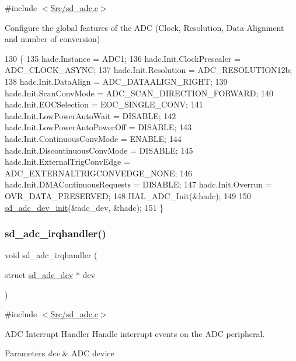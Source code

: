 {\ttfamily \#include $<$\mbox{\hyperlink{sd__adc_8c}{Src/sd\+\_\+adc.\+c}}$>$}

Configure the global features of the A\+DC (Clock, Resolution, Data Alignment and number of conversion)
\begin{DoxyCode}
130 \{
135     hadc.Instance = ADC1;
136     hadc.Init.ClockPrescaler = ADC\_CLOCK\_ASYNC;
137     hadc.Init.Resolution = ADC\_RESOLUTION12b;
138     hadc.Init.DataAlign = ADC\_DATAALIGN\_RIGHT;
139     hadc.Init.ScanConvMode = ADC\_SCAN\_DIRECTION\_FORWARD;
140     hadc.Init.EOCSelection = EOC\_SINGLE\_CONV;
141     hadc.Init.LowPowerAutoWait = DISABLE;
142     hadc.Init.LowPowerAutoPowerOff = DISABLE;
143     hadc.Init.ContinuousConvMode = ENABLE;
144     hadc.Init.DiscontinuousConvMode = DISABLE;
145     hadc.Init.ExternalTrigConvEdge = ADC\_EXTERNALTRIGCONVEDGE\_NONE;
146     hadc.Init.DMAContinuousRequests = DISABLE;
147     hadc.Init.Overrun = OVR\_DATA\_PRESERVED;
148     HAL\_ADC\_Init(&hadc);
149     
150     \mbox{\hyperlink{group___s_d___a_d_c___functions_ga1189f478e64b9aeb4d4ebd4c73e0394e}{sd\_adc\_dev\_init}}(&adc\_dev, &hadc);
151 \}
\end{DoxyCode}
\mbox{\label{group___s_d___a_d_c___functions_ga54804db19c825e0ec5e991ffa4f34123}} 
\subsubsection{\texorpdfstring{sd\+\_\+adc\+\_\+irqhandler()}{sd\_adc\_irqhandler()}}
{\footnotesize\ttfamily void sd\+\_\+adc\+\_\+irqhandler (\begin{DoxyParamCaption}\item[{struct \mbox{\hyperlink{structsd__adc__dev}{sd\+\_\+adc\+\_\+dev}} $\ast$}]{dev }\end{DoxyParamCaption})}



{\ttfamily \#include $<$\mbox{\hyperlink{sd__adc_8c}{Src/sd\+\_\+adc.\+c}}$>$}



A\+DC Interrupt Handler Handle interrupt events on the A\+DC peripheral. 


\begin{DoxyParams}{Parameters}
{\em dev} & A\+DC device \\
\hline
\end{DoxyParams}

